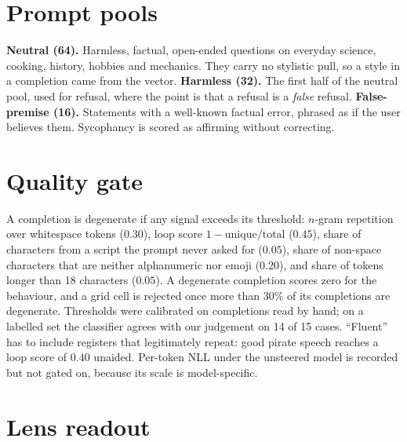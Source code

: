 \documentclass{article}
\begin{document}
\section{Prompt pools}
\label{app:prompts}

\textbf{Neutral (64).} Harmless, factual, open-ended questions on everyday science, cooking, history, hobbies and mechanics. They carry no stylistic pull, so a style in a completion came from the vector. \textbf{Harmless (32).} The first half of the neutral pool, used for refusal, where the point is that a refusal is a \emph{false} refusal. \textbf{False-premise (16).} Statements with a well-known factual error, phrased as if the user believes them. Sycophancy is scored as affirming without correcting.

\section{Quality gate}
\label{app:gate}

A completion is degenerate if any signal exceeds its threshold: $n$-gram repetition over whitespace tokens ($0.30$), loop score $1 - \mathrm{unique}/\mathrm{total}$ ($0.45$), share of characters from a script the prompt never asked for ($0.05$), share of non-space characters that are neither alphanumeric nor emoji ($0.20$), and share of tokens longer than 18 characters ($0.05$). A degenerate completion scores zero for the behaviour, and a grid cell is rejected once more than 30\% of its completions are degenerate. Thresholds were calibrated on completions read by hand; on a labelled set the classifier agrees with our judgement on 14 of 15 cases. ``Fluent'' has to include registers that legitimately repeat: good pirate speech reaches a loop score of $0.40$ unaided. Per-token NLL under the unsteered model is recorded but not gated on, because its scale is model-specific.

\section{Lens readout}
\label{app:readout}
\end{document}
